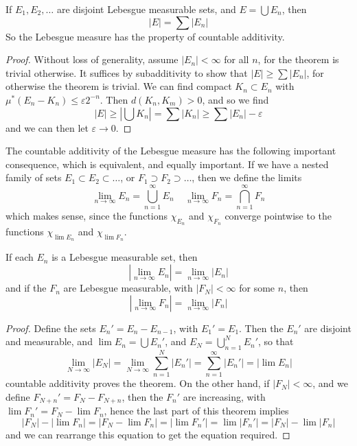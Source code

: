 \begin{theorem}
  If $E_1, E_2, \dots$ are disjoint Lebesgue measurable sets, and $E = \bigcup E_n$, then
  \[ \left| E \right| = \sum |E_n| \]
  So the Lebesgue measure has the property of countable additivity.
\end{theorem}
\begin{proof}
  Without loss of generality, assume $|E_n| < \infty$ for all $n$, for the theorem is trivial otherwise. It suffices by subadditivity to show that $|E| \geq \sum |E_n|$, for otherwise the theorem is trivial. We can find compact $K_n \subset E_n$ with $\mu^*(E_n - K_n) \leq \varepsilon 2^{-n}$. Then $d(K_n,K_m) > 0$, and so we find
  \[ |E| \geq \left| \bigcup K_n \right| = \sum |K_n| \geq \sum |E_n| - \varepsilon \]
  and we can then let $\varepsilon \to 0$.
\end{proof}

The countable additivity of the Lebesgue measure has the following important consequence, which is equivalent, and equally important. If we have a nested family of sets $E_1 \subset E_2 \subset \dots$, or $F_1 \supset F_2 \supset \dots$, then we define the limits
%
\[ \lim_{n \to \infty} E_n = \bigcup_{n = 1}^\infty E_n\ \ \ \ \ \lim_{n \to \infty} F_n = \bigcap_{n = 1}^\infty F_n \]
%
which makes sense, since the functions $\chi_{E_n}$ and $\chi_{F_n}$ converge pointwise to the functions $\chi_{\lim E_n}$ and $\chi_{\lim F_n}$.

\begin{theorem}
  If each $E_n$ is a Lebesgue measurable set, then
  \[ |\lim_{n \to \infty} E_n| = \lim_{n \to \infty} |E_n| \]
  and if the $F_n$ are Lebesgue measurable, with $|F_N| < \infty$ for some $n$, then
  \[ |\lim_{n \to \infty} F_n| = \lim_{n \to \infty} |F_n| \]
\end{theorem}
\begin{proof}
  Define the sets $E_n' = E_n - E_{n-1}$, with $E_1' = E_1$. Then the $E_n'$ are disjoint and measurable, and $\lim E_n = \bigcup E_n'$, and $E_N = \bigcup_{n = 1}^N E_n'$, so that
  \[ \lim_{N \to \infty} |E_N| = \lim_{N \to \infty} \sum_{n = 1}^N |E_n'| = \sum_{n = 1}^\infty |E_n'| = |\lim E_n| \]
  countable additivity proves the theorem. On the other hand, if $|F_N| < \infty$, and we define $F_{N+n}' = F_N - F_{N+n}$, then the $F_n'$ are increasing, with $\lim F_n' = F_N - \lim F_n$, hence the last part of this theorem implies
  \[ |F_N| - |\lim F_n| = |F_N - \lim F_n| = |\lim F_n'| = \lim |F_n'| = |F_N| - \lim |F_n| \]
  and we can rearrange this equation to get the equation required.
\end{proof}

